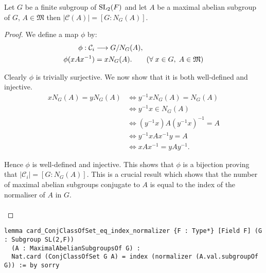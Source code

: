 \begin{theorem}
\label{card_ConjClassOfSet_eq_index_normalizer}
\leanok

Let $G$ be a finite subgroup of $\operatorname{SL}_2(F)$ and let $A$ be a maximal abelian subgroup of $G$, 
$A \in \mathfrak{M}$ then $|\mathcal{C}(A)| = [G : N_G(A)]$.
\end{theorem}
\begin{proof}
  We define a map $\phi$ by:
  \begin{align*} \phi: \mathcal{C}_i &\longrightarrow G / N_G(A),
  \\ \phi(xAx^{-1}) &= xN_G(A). \tag{$\forall \; x \in G, \; A \in \mathfrak{M}$}
  \end{align*}
  
  Clearly $\phi$ is trivially surjective. We now show that it is both well-defined and injective.
  \begin{align*} xN_G(A) = yN_G(A) &\iff y^{-1}xN_G(A) = N_G(A) \\
  &\iff y^{-1}x \in N_G(A) \\
  &\iff (y^{-1}x)A(y^{-1}x)^{-1} = A \\
  &\iff y^{-1}xAx^{-1}y = A \\
  &\iff xAx^{-1} = yAy^{-1}.
  \end{align*}
  
  Hence $\phi$ is well-defined and injective. This shows that $\phi$ is a bijection proving that $|\mathcal{C}_i| = [G:N_G(A)]$. This is a crucial result which shows that the number of maximal abelian subgroups conjugate to $A$ is equal to the index of the normaliser of $A$ in $G$. \\
  \\
\end{proof}
\begin{footnotesize}
\begin{verbatim}
lemma card_ConjClassOfSet_eq_index_normalizer {F : Type*} [Field F] (G : Subgroup SL(2,F))
  (A : MaximalAbelianSubgroupsOf G) :
  Nat.card (ConjClassOfSet G A) = index (normalizer (A.val.subgroupOf G)) := by sorry
\end{verbatim}
\end{footnotesize}

